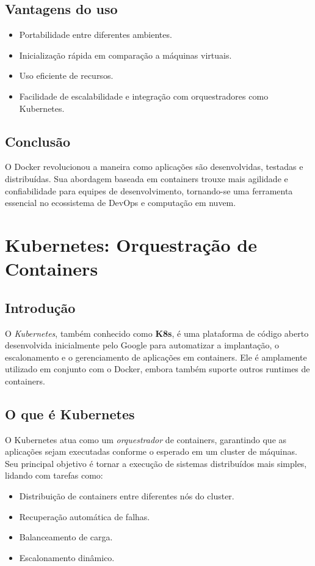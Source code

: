 \documentclass{abntex2}
\begin{document}
\section{Vantagens do uso}
\begin{itemize}
    \item Portabilidade entre diferentes ambientes.
    \item Inicialização rápida em comparação a máquinas virtuais.
    \item Uso eficiente de recursos.
    \item Facilidade de escalabilidade e integração com orquestradores como Kubernetes.
\end{itemize}

\section{Conclusão}
O Docker revolucionou a maneira como aplicações são desenvolvidas, testadas e distribuídas. 
Sua abordagem baseada em containers trouxe mais agilidade e confiabilidade para equipes de desenvolvimento, tornando-se uma ferramenta essencial no ecossistema de DevOps e computação em nuvem.




\chapter{Kubernetes: Orquestração de Containers}

\section{Introdução}
O \textit{Kubernetes}, também conhecido como \textbf{K8s}, é uma plataforma de código aberto desenvolvida inicialmente pelo Google para automatizar a implantação, o escalonamento e o gerenciamento de aplicações em containers. 
Ele é amplamente utilizado em conjunto com o Docker, embora também suporte outros runtimes de containers.

\section{O que é Kubernetes}
O Kubernetes atua como um \textit{orquestrador} de containers, garantindo que as aplicações sejam executadas conforme o esperado em um cluster de máquinas. 
Seu principal objetivo é tornar a execução de sistemas distribuídos mais simples, lidando com tarefas como:
\begin{itemize}
    \item Distribuição de containers entre diferentes nós do cluster.
    \item Recuperação automática de falhas.
    \item Balanceamento de carga.
    \item Escalonamento dinâmico.
\end{itemize}
\end{document}
